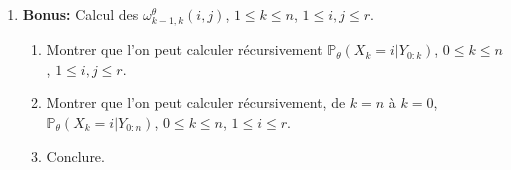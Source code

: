 \documentclass[a4paper,10pt,fleqn]{article}
\newcommand{\eqsp}{\,}
\newcommand{\1}{\ensuremath{\mathbbm{1}}}
\begin{document}
\begin{enumerate}
{\em
Si l'on souhaite utiliser une m\'ethode du premier ordre on peut \'ecrire, pour $p\geq 0$,
$$
\tilde \theta^{(p+1)} = \tilde \theta^{(p)} + \gamma_p \mathbb{E}_{\theta^{(p)}}\left[\nabla_{\theta=\theta^{(p)}}\log p_\theta(X_{0:n},Y_{0:n}) \middle |Y_{0:n}\right]\,,
$$
o\`u les $\{\gamma_p\}_{p\geq 0}$ sont des pas positifs.
}
\item {\bf Bonus:} Calcul des $\omega_{k-1,k}^{\theta}(i,j)$, $1\leq k \leq n$, $1\leq i, j \leq r$.
\begin{enumerate}
\item Montrer que l'on peut calculer r\'ecursivement $ \mathbb{P}_{\theta}\left(X_k=i|Y_{0:k}\right)$, $0\leq k \leq n$, $1\leq i, j \leq r$.
\item Montrer que l'on peut calculer r\'ecursivement, de $k=n$ \`a $k = 0$, $ \mathbb{P}_{\theta}\left(X_k=i|Y_{0:n}\right)$, $0\leq k \leq n$, $1\leq i\leq r$.
\item Conclure.
\end{enumerate}
\end{enumerate}


\end{document}
